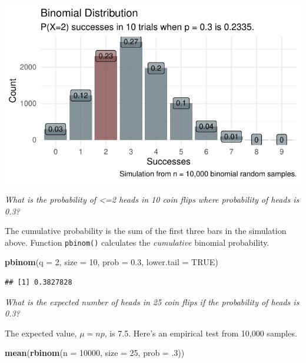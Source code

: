 \documentclass[]{book}
\newenvironment{Shaded}{\begin{snugshade}}{\end{snugshade}}
\newcommand{\DataTypeTok}[1]{\textcolor[rgb]{0.13,0.29,0.53}{#1}}
\newcommand{\DecValTok}[1]{\textcolor[rgb]{0.00,0.00,0.81}{#1}}
\newcommand{\FloatTok}[1]{\textcolor[rgb]{0.00,0.00,0.81}{#1}}
\newcommand{\KeywordTok}[1]{\textcolor[rgb]{0.13,0.29,0.53}{\textbf{#1}}}
\newcommand{\NormalTok}[1]{#1}
\newcommand{\OtherTok}[1]{\textcolor[rgb]{0.56,0.35,0.01}{#1}}
\begin{document}
\includegraphics{data-sci_files/figure-latex/unnamed-chunk-3-1.pdf}

\emph{What is the probability of \textless=2 heads in 10 coin flips where probability of heads is 0.3?}

The cumulative probability is the sum of the first three bars in the simulation above. Function \texttt{pbinom()} calculates the \emph{cumulative} binomial probability.

\begin{Shaded}
\begin{Highlighting}[]
\KeywordTok{pbinom}\NormalTok{(}\DataTypeTok{q =} \DecValTok{2}\NormalTok{, }\DataTypeTok{size =} \DecValTok{10}\NormalTok{, }\DataTypeTok{prob =} \FloatTok{0.3}\NormalTok{, }\DataTypeTok{lower.tail =} \OtherTok{TRUE}\NormalTok{)}
\end{Highlighting}
\end{Shaded}

\begin{verbatim}
## [1] 0.3827828
\end{verbatim}

\emph{What is the expected number of heads in 25 coin flips if the probability of heads is 0.3?}

The expected value, \(\mu = np\), is 7.5. Here's an empirical test from 10,000 samples.

\begin{Shaded}
\begin{Highlighting}[]
\KeywordTok{mean}\NormalTok{(}\KeywordTok{rbinom}\NormalTok{(}\DataTypeTok{n =} \DecValTok{10000}\NormalTok{, }\DataTypeTok{size =} \DecValTok{25}\NormalTok{, }\DataTypeTok{prob =} \FloatTok{.3}\NormalTok{))}
\end{Highlighting}
\end{Shaded}
\end{document}
